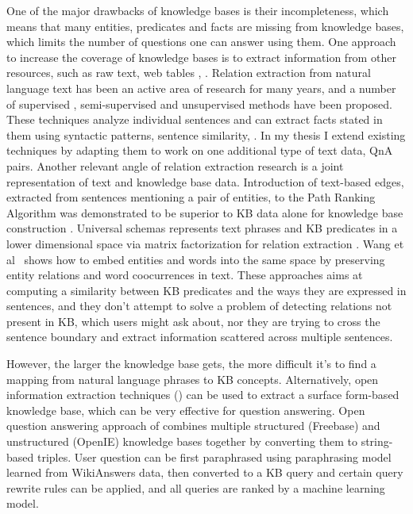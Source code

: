 One of the major drawbacks of knowledge bases is their incompleteness, which means that many entities, predicates and facts are missing from knowledge bases, which limits the number of questions one can answer using them.
One approach to increase the coverage of knowledge bases is to extract information from other resources, such as raw text\cite{MintzBSJ09,jijkoun2004information,Gupta:2014:BOS:2732286.2732288}, web tables \cite{Cafarella:2008:WEP:1453856.1453916}, \etc.
Relation extraction from natural language text has been an active area of research for many years, and a number of supervised \cite{snow2004learning}, semi-supervised \cite{Agichtein:2000:SER:336597.336644} and unsupervised \cite{Fader:2011:IRO:2145432.2145596} methods have been proposed.
These techniques analyze individual sentences and can extract facts stated in them using syntactic patterns, sentence similarity, \etc.
In my thesis I extend existing techniques by adapting them to work on one additional type of text data, \ie QnA pairs.
Another relevant angle of relation extraction research is a joint representation of text and knowledge base data.
Introduction of text-based edges, extracted from sentences mentioning a pair of entities, to the Path Ranking Algorithm was demonstrated to be superior to KB data alone for knowledge base construction \cite{lao2012reading}.
Universal schemas represents text phrases and KB predicates in a lower dimensional space via matrix factorization for relation extraction \cite{riedel2013relation}.
Wang et al~\cite{wang2014knowledge} shows how to embed entities and words into the same space by preserving entity relations and word coocurrences in text.
These approaches aims at computing a similarity between KB predicates and the ways they are expressed in sentences, and they don't attempt to solve a problem of detecting relations not present in KB, which users might ask about, nor they are trying to cross the sentence boundary and extract information scattered across multiple sentences.

However, the larger the knowledge base gets, the more difficult it's to find a mapping from natural language phrases to KB concepts.
Alternatively, open information extraction techniques (\cite{Etzioni:2008:OIE:1409360.1409378}) can be used to extract a surface form-based knowledge base, which can be very effective for question answering.
Open question answering approach of \cite{Fader:2014:OQA:2623330.2623677} combines multiple structured (Freebase) and unstructured (OpenIE) knowledge bases together by converting them to string-based triples.
User question can be first paraphrased using paraphrasing model learned from WikiAnswers data, then converted to a KB query and certain query rewrite rules can be applied, and all queries are ranked by a machine learning model.

